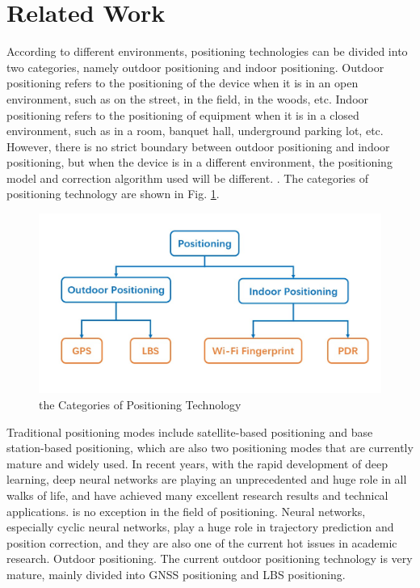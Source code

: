 \documentclass[conference]{IEEEtran}
\begin{document}
\section{Related Work}
According to different environments, positioning technologies can be divided into two categories, namely outdoor positioning and indoor positioning. Outdoor positioning refers to the positioning of the device when it is in an open environment, such as on the street, in the field, in the woods, etc. Indoor positioning refers to the positioning of equipment when it is in a closed environment, such as in a room, banquet hall, underground parking lot, etc. However, there is no strict boundary between outdoor positioning and indoor positioning, but when the device is in a different environment, the positioning model and correction algorithm used will be different. \cite{env-urban}. The categories of positioning technology are shown in Fig. \ref{fig:category}.

\begin{figure}[t]
	\centering
	\includegraphics[scale=0.4]{./figures/category.jpg}
	\caption{the Categories of Positioning Technology}
	\label{fig:category}
\end{figure}

Traditional positioning modes include satellite-based positioning and base station-based positioning, which are also two positioning modes that are currently mature and widely used. In recent years, with the rapid development of deep learning, deep neural networks are playing an unprecedented and huge role in all walks of life, and have achieved many excellent research results and technical applications. \cite{env-cv} is no exception in the field of positioning. Neural networks, especially cyclic neural networks, play a huge role in trajectory prediction and position correction, and they are also one of the current hot issues in academic research. \cite{gps-1}
Outdoor positioning. The current outdoor positioning technology is very mature, mainly divided into GNSS positioning and LBS positioning.
\end{document}
